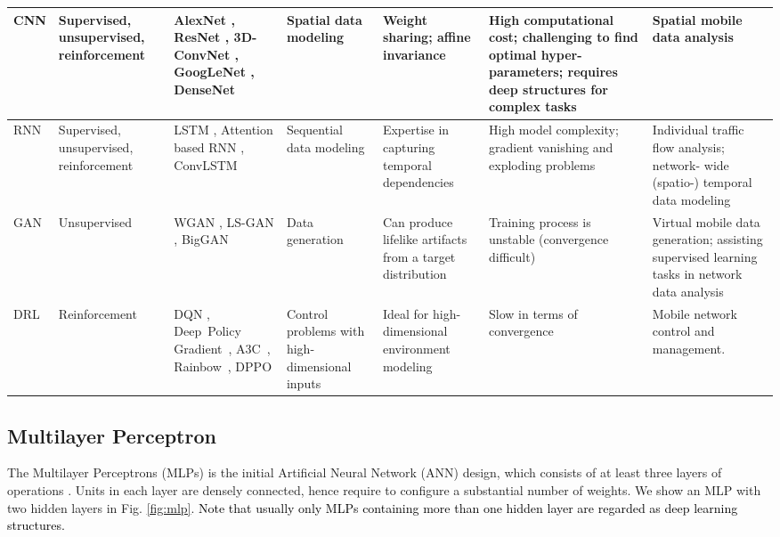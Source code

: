 \documentclass[journal,comsoc,letter]{IEEEtran}
\newcommand{\rev}[1]{\textcolor{black}{#1}}
\begin{document}
\begin{table*}[h]
\begin{tabular}{|C{1cm}|C{1.8cm}|C{2.3cm}|C{2cm}|C{2.5cm}|C{2.5cm}|C{2.5cm}|}
CNN       &        Supervised, unsupervised, reinforcement            &      AlexNet \cite{krizhevsky2012imagenet}, ResNet \cite{he2016deep}, 3D-ConvNet \cite{ji20133d}, GoogLeNet \cite{szegedy2015going}, DenseNet \cite{huang2017densely}               &  Spatial data modeling                 & Weight sharing; affine invariance &   High computational cost; challenging to find optimal hyper-parameters; requires deep structures for complex tasks   &      Spatial mobile data analysis                              \\ \hline
RNN       &        Supervised, unsupervised, reinforcement            &      LSTM \cite{gers1999learning}, Attention based RNN \cite{sutskever2014sequence}, ConvLSTM \cite{xingjian2015convolutional}               &        Sequential data modeling          &   Expertise in capturing temporal dependencies  & High model complexity; gradient vanishing and exploding problems     &          Individual traffic flow analysis; network- wide (spatio-) temporal data modeling                                  \\ \hline {}
GAN       &      Unsupervised             &          WGAN \cite{arjovsky2017wasserstein}, LS-GAN \cite{qi2017loss}, BigGAN \cite{brock2018large}         &   Data generation    &   Can produce lifelike artifacts from a target distribution  &  Training process is unstable (convergence difficult)   &   Virtual mobile data generation; assisting supervised learning tasks in network data analysis                                     \\ \hline {}
DRL       &      Reinforcement        &         DQN \cite{mnih2015human}, Deep~Policy Gradient~\cite{silver2016mastering}, A3C~\cite{mnih2016asynchronous}, Rainbow~\cite{hessel2017rainbow}, DPPO \cite{schulman2017proximal}             &    Control problems with high- dimensional inputs              &  Ideal for high-dimensional environment  modeling   &  Slow in terms of convergence    &     Mobile network control and management.                                       \\ \hline
\end{tabular}
\end{table*}

\subsection{Multilayer Perceptron}
The Multilayer Perceptrons (MLPs) is the initial Artificial Neural Network (ANN) design, which consists of at least three layers of operations \cite{collobert2004links}. Units in each layer are densely connected, hence require to configure a substantial number of weights. We show an MLP with two hidden layers in Fig. \ref{fig:mlp}. \rev{Note that usually only MLPs containing more than one hidden layer are regarded as deep learning structures.} 
\end{document}
